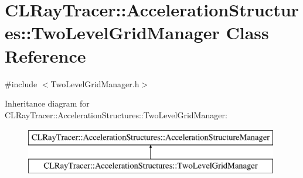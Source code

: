 \hypertarget{class_c_l_ray_tracer_1_1_acceleration_structures_1_1_two_level_grid_manager}{}\section{C\+L\+Ray\+Tracer\+:\+:Acceleration\+Structures\+:\+:Two\+Level\+Grid\+Manager Class Reference}
\label{class_c_l_ray_tracer_1_1_acceleration_structures_1_1_two_level_grid_manager}


{\ttfamily \#include $<$Two\+Level\+Grid\+Manager.\+h$>$}

Inheritance diagram for C\+L\+Ray\+Tracer\+:\+:Acceleration\+Structures\+:\+:Two\+Level\+Grid\+Manager\+:\begin{figure}[H]
\begin{center}
\leavevmode
\includegraphics[height=2.000000cm]{class_c_l_ray_tracer_1_1_acceleration_structures_1_1_two_level_grid_manager}
\end{center}
\end{figure}
